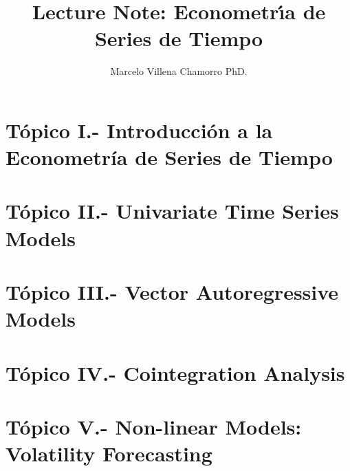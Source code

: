 \documentclass{easyclass}
\begin{document}
\begin{titlepage}
    \title{Lecture Note: Econometr\'\i{}a de Series de Tiempo }
    \author{Marcelo Villena Chamorro PhD.}
    \maketitle
\end{titlepage}

\tableofcontents

\chapter{Tópico I.- Introducción a la Econometría de Series de Tiempo}

\chapter{Tópico II.- Univariate Time Series Models}

\chapter{Tópico III.- Vector Autoregressive Models}

\chapter{Tópico IV.- Cointegration Analysis}

\chapter{T\'opico V.- Non-linear Models: Volatility Forecasting}




\end{document}
